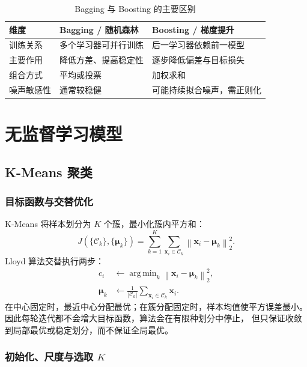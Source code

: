 \documentclass[UTF8,zihao=-4,a4paper,fontset=windows]{ctexart}
\DeclareMathOperator*{\argmin}{arg\,min}
\newcommand{\norm}[1]{\left\lVert #1\right\rVert}
\newcommand{\abs}[1]{\left|#1\right|}
\begin{document}
\begin{table}[H]
\centering
\caption{Bagging 与 Boosting 的主要区别}
\begin{tabularx}{\textwidth}{L{2.6cm}Y Y}
\toprule
\textbf{维度} & \textbf{Bagging / 随机森林} & \textbf{Boosting / 梯度提升}\\
\midrule
训练关系 & 多个学习器可并行训练 & 后一学习器依赖前一模型\\
主要作用 & 降低方差、提高稳定性 & 逐步降低偏差与目标损失\\
组合方式 & 平均或投票 & 加权求和\\
噪声敏感性 & 通常较稳健 & 可能持续拟合噪声，需正则化\\
\bottomrule
\end{tabularx}
\end{table}

\section{无监督学习模型}

\subsection{K-Means 聚类}

\subsubsection{目标函数与交替优化}

K-Means 将样本划分为 $K$ 个簇，最小化簇内平方和\cite{macqueen}：
\begin{equation}
  J(\{\mathcal{C}_k\},\{\bm{\mu}_k\})
  =\sum_{k=1}^{K}\sum_{\bm{x}_i\in\mathcal{C}_k}
  \norm{\bm{x}_i-\bm{\mu}_k}_2^2.
\end{equation}
Lloyd 算法交替执行两步：
\begin{align}
  c_i
  &\leftarrow\argmin_k
  \norm{\bm{x}_i-\bm{\mu}_k}_2^2,\\
  \bm{\mu}_k
  &\leftarrow\frac{1}{\abs{\mathcal{C}_k}}
  \sum_{\bm{x}_i\in\mathcal{C}_k}\bm{x}_i.
\end{align}
在中心固定时，最近中心分配最优；在簇分配固定时，样本均值使平方误差最小。
因此每轮迭代都不会增大目标函数，算法会在有限种划分中停止，
但只保证收敛到局部最优或稳定划分，而不保证全局最优。

\subsubsection{初始化、尺度与选取 $K$}
\end{document}
